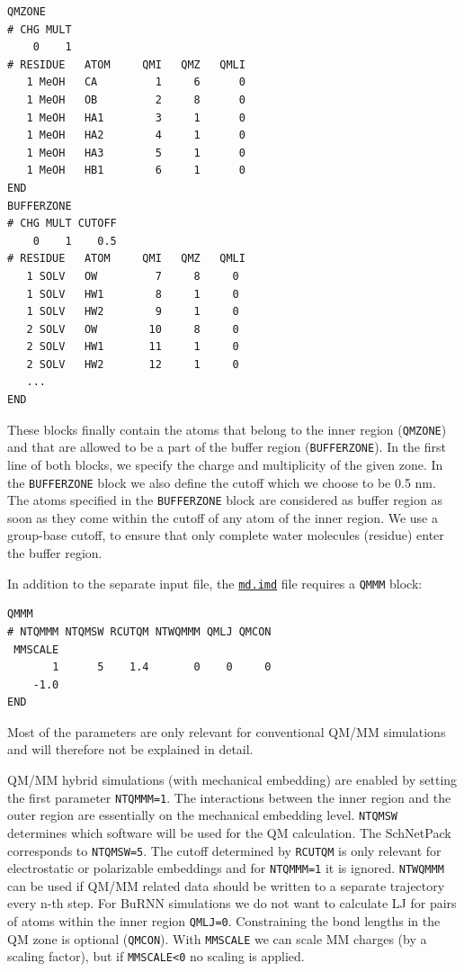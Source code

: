 \begin{lstlisting}[breaklines=true, breakatwhitespace=false]
QMZONE
# CHG MULT
    0    1
# RESIDUE   ATOM     QMI   QMZ   QMLI
   1 MeOH   CA         1     6      0
   1 MeOH   OB         2     8      0
   1 MeOH   HA1        3     1      0
   1 MeOH   HA2        4     1      0
   1 MeOH   HA3        5     1      0
   1 MeOH   HB1        6     1      0
END
BUFFERZONE
# CHG MULT CUTOFF 
    0    1    0.5
# RESIDUE   ATOM     QMI   QMZ   QMLI
   1 SOLV   OW         7     8     0
   1 SOLV   HW1        8     1     0
   1 SOLV   HW2        9     1     0
   2 SOLV   OW        10     8     0
   2 SOLV   HW1       11     1     0
   2 SOLV   HW2       12     1     0
   ...
END
\end{lstlisting}


These blocks finally contain the atoms that belong to the inner region (\texttt{QMZONE}) and that are allowed to be a part of the buffer region (\texttt{BUFFERZONE}). In the first line of both blocks, we specify the charge and multiplicity of the given zone. In the \texttt{BUFFERZONE} block we also define the cutoff which we choose to be 0.5 nm. The atoms specified in the \texttt{BUFFERZONE} block are considered as buffer region as soon as they come within the cutoff of any atom of the inner region. We use a group-base cutoff, to ensure that only complete water molecules (residue) enter the buffer region.

In addition to the separate input file, the \href{https://github.com/LierB/gromos_tutorial_livecoms/blob/burnn_tutorial_rc/tutorial_files/t_06/md_burnn/md.imd}{\texttt{md.imd}} file requires a \texttt{QMMM} block:
\begin{lstlisting}[breaklines=true, breakatwhitespace=false]
QMMM
# NTQMMM NTQMSW RCUTQM NTWQMMM QMLJ QMCON      
 MMSCALE
       1      5    1.4       0    0     0
    -1.0
END
\end{lstlisting}

Most of the parameters are only relevant for conventional QM/MM simulations and will therefore not be explained in detail.

QM/MM hybrid simulations (with mechanical embedding) are enabled by setting the first parameter \texttt{NTQMMM=1}. The interactions between the inner region and the outer region are essentially on the mechanical embedding level. \texttt{NTQMSW} determines which software will be used for the QM calculation. The SchNetPack corresponds to \texttt{NTQMSW=5}. The cutoff determined by \texttt{RCUTQM} is only relevant for electrostatic or polarizable embeddings and for \texttt{NTQMMM=1} it is ignored. \texttt{NTWQMMM} can be used if QM/MM related data should be written to a separate trajectory every n-th step. For BuRNN simulations we do not want to calculate LJ for pairs of atoms within the inner region \texttt{QMLJ=0}. Constraining the bond lengths in the QM zone is optional (\texttt{QMCON}). With \texttt{MMSCALE} we can scale MM charges (by a scaling factor), but if \texttt{MMSCALE<0} no scaling is applied.

